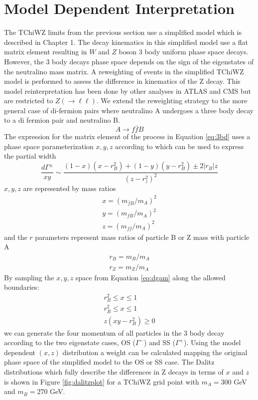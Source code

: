 \section{Model Dependent Interpretation}
The TChiWZ limits from the previous section use a simplified model which is described in Chapter 1. The decay kinematics in this simplified model  use a flat matrix element resulting in $W$ and $Z$ boson 3 body uniform phase space decays. However, the 3 body decays phase space depends on the sign of the eigenstates of the neutralino mass matrix. A reweighting of events in the simplified TChiWZ model is performed to assess the difference in kinematics of the Z decay. This model reinterpretation has been done by other analyses in ATLAS and CMS \cite{CMS:2021edw}\cite{ATLAS:2019lng} but are restricted to $Z(\rightarrow \ell\ell)$. We extend the reweighting strategy to the more general case of di-fermion pairs where neutralino A undergoes a three body decay to a di fermion pair and neutralino B. 
\begin{equation}
\label{eq:3bd}
A \rightarrow f \bar{f} B
\end{equation}
The expression for the matrix element of the process in Equation \ref{eq:3bd} uses a phase space parameterization $x,y,z$ according to \cite{Nojiri:1999ki} which can be used to express the partial width 
\begin{equation}
\label{eq:dgam}
\frac{d\Gamma^\pm}{xy}\sim \frac{(1-x)(x-r_B^2)+(1-y)(y-r_B^2)\pm 2|r_B|z}{(z-r_z^2)^2}
\end{equation}
$x,y,z$ are represented by mass ratios
\begin{equation}
\begin{split}
x=(m_{\bar{f}B}/m_A)^2 \\
y=(m_{fB}/m_A)^2 \\
z=(m_{f\bar{f}}/m_A)^2 
\end{split}
\end{equation} 
and the $r$ parameters represent mass ratios of particle B or Z mass with particle A
\begin{equation}
\begin{split}
r_B = m_B/m_A \\
r_Z = m_Z/m_A 
\end{split}
\end{equation}
By sampling the $x,y,z$ space from Equation \ref{eq:dgam} along the allowed boundaries:
\begin{equation}
\begin{split}
r_B^2 \leq x \leq 1 \\
r_B^2 \leq x \leq 1 \\
z(xy-r_B^2) \geq 0
\end{split}
\end{equation}
we can generate the four momentum of all particles in the 3 body decay according to the two eigenstate cases, OS ($\Gamma^-$) and SS ($\Gamma^+$). Using the model dependent $(x,z)$ distribution a weight can be calculated mapping the original phase space of the simplified model to the OS or SS case. The  Dalitz distributions which fully describe the differences in Z decays in terms of $x$ and $z$ is shown in Figure \ref{fig:dalitzplot} for a TChiWZ grid point with $m_A = 300$ GeV and $m_B= 270$ GeV.

